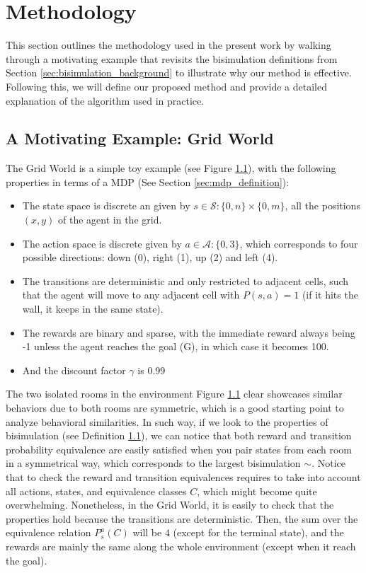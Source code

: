 
\chapter{Methodology}
This section outlines the methodology used in the present work by walking through a motivating example that revisits the bisimulation definitions from Section \ref{sec:bisimulation_background} to illustrate why our method is effective. Following this, we will define our proposed method and provide a detailed explanation of the algorithm used in practice.

\section{A Motivating Example: Grid World}

The Grid World is a simple toy example (see Figure \ref{}), with the following properties in terms of a MDP (See Section \ref{sec:mdp_definition}):

\begin{itemize}
    \item The state space is discrete an given by $ s \in \mathcal{S} : \{0,n\} \times \{0,m\}$, all the positions $(x,y)$ of the agent in the grid.
    \item The action space is discrete given by $a \in \mathcal{A}: \{0,3\}$, which corresponds to four possible directions: down (0), right (1), up (2) and left (4).
    \item The transitions are deterministic and only restricted to adjacent cells, such that the agent will move to any adjacent cell with $P(s,a) = 1$ (if it hits the wall, it keeps in the same state).
    \item The rewards are binary and sparse, with the immediate reward always being -1 unless the agent reaches the goal (G), in which case it becomes 100.
    \item And the discount factor $\gamma$ is 0.99
\end{itemize}

The two isolated rooms in the environment Figure \ref{} clear showcases similar behaviors due to both rooms are symmetric, which is a good starting point to analyze behavioral similarities. In such way, if we look to the properties of bisimulation (see Definition \ref{}), we can notice that both reward and transition probability equivalence are easily satisfied when you pair states from each room in a symmetrical way, which corresponds to the largest bisimulation $\sim$. Notice that to check the reward and transition equivalences requires to take into account all actions, states, and equivalence classes $C$, which might become quite overwhelming. Nonetheless, in the Grid World, it is easily to check that the properties hold because the transitions are deterministic. Then, the sum over the equivalence relation $P_s^a(C)$ will be $4$ (except for the terminal state), and the rewards are mainly the same along the whole environment (except when it reach the goal).

